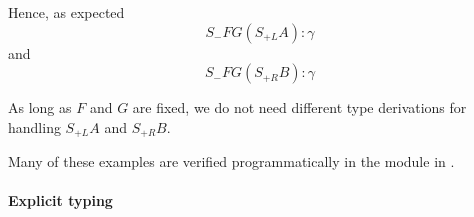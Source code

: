 \begin{example}
\begin{thmenum}
    Hence, as expected
    \begin{equation*}
      S_- F G (S_{+L} A): \gamma
    \end{equation*}
    and
    \begin{equation*}
      S_- F G (S_{+R} B): \gamma
    \end{equation*}

    As long as \( F \) and \( G \) are fixed, we do not need different type derivations for handling \( S_{+L} A \) and \( S_{+R} B \).
  \end{thmenum}
\end{example}
\begin{comments}
  \item Many of these examples are verified programmatically in the module  in \cite{notebook:code}.
\end{comments}

\paragraph{Explicit typing}

